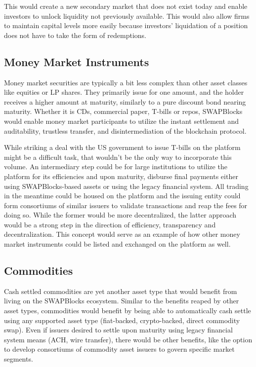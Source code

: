 \documentclass[12pt]{article}
\begin{document}
This would create a new secondary market that does not exist today and enable investors to unlock liquidity not 
previously available. This would also allow firms to maintain capital levels more easily because investors’ 
liquidation of a position does not have to take the form of redemptions.

\subsection{Money Market Instruments}

Money market securities are typically a bit less complex than other asset classes like equities or LP shares. They 
primarily issue for one amount, and the holder receives a higher amount at maturity, similarly to a pure discount 
bond nearing maturity. Whether it is CDs, commercial paper, T-bills or repos, SWAPBlocks would enable money market 
participants to utilize the instant settlement and auditability, trustless transfer, and disintermediation of 
the blockchain protocol.

While striking a deal with the US government to issue T-bills on the platform might be a difficult task, that 
wouldn’t be the only way to incorporate this volume. An intermediary step could be for large institutions to 
utilize the platform for its efficiencies and upon maturity, disburse final payments either using SWAPBlocks-based 
assets or using the legacy financial system. All trading in the meantime could be housed on the platform and the 
issuing entity could form consortiums of similar issuers to validate transactions and reap the fees for doing so. 
While the former would be more decentralized, the latter approach would be a strong step in the direction of 
efficiency, transparency and decentralization. This concept would serve as an example of how other money market 
instruments could be listed and exchanged on the platform as well.

\subsection{Commodities}
Cash settled commodities are yet another asset type that would benefit from living on the SWAPBlocks ecosystem. 
Similar to the benefits reaped by other asset types, commodities would benefit by being able to automatically cash 
settle using any supported asset type (fiat-backed, crypto-backed, direct commodity swap). Even if issuers desired 
to settle upon maturity using legacy financial system means (ACH, wire transfer), there would be other benefits, 
like the option to develop consortiums of commodity asset issuers to govern specific market segments.
\end{document}
